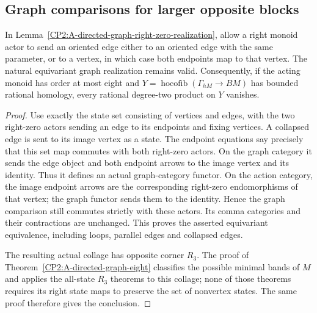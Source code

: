 \subsection{Graph comparisons for larger opposite blocks}

\begin{lemma}
\label{CP2:A-directed-graph-collapses-eight}
In Lemma~\ref{CP2:A-directed-graph-right-zero-realization}, allow a
right monoid actor to send an oriented edge either to an oriented edge
with the same parameter, or to a vertex, in which case both endpoints
map to that vertex.  The natural equivariant graph realization remains
valid.  Consequently, if the acting monoid has order at most eight and
$Y=\operatorname{hocofib}(\Gamma_{hM}\to BM)$ has bounded rational
homology, every rational degree-two product on $Y$ vanishes.
\end{lemma}
\begin{proof}
Use exactly the state set consisting of vertices and edges, with the
two right-zero actors sending an edge to its endpoints and fixing
vertices.  A collapsed edge is sent to its image vertex as a state.
The endpoint equations say precisely that this set map commutes with
both right-zero actors.  On the graph category it sends the edge
object and both endpoint arrows to the image vertex and its identity.
Thus it defines an actual graph-category functor.  On the action
category, the image endpoint arrows are the corresponding right-zero
endomorphisms of that vertex; the graph functor sends them to the
identity.  Hence the graph comparison still commutes strictly with
these actors.  Its comma categories and their contractions are
unchanged.  This proves the asserted equivariant equivalence, including
loops, parallel edges and collapsed edges.

The resulting actual collage has opposite corner $R_3$.  The proof of
Theorem~\ref{CP2:A-directed-graph-eight} classifies the possible minimal
bands of $M$ and applies the all-state $R_3$ theorems to this collage;
none of those theorems requires its right state maps to preserve the
set of nonvertex states.  The same proof therefore gives the conclusion.
\end{proof}

